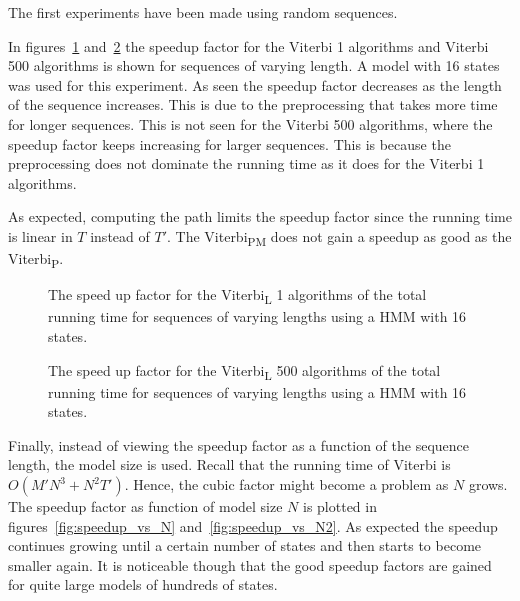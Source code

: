 The first experiments have been made using random sequences.

In figures~\ref{fig:compressed_1_speedup_vs_sequence_length}
and~\ref{fig:compressed_500_speedup_vs_sequence_length} the speedup factor for
the Viterbi 1 algorithms and Viterbi 500 algorithms is shown for sequences of
varying length. A model with 16 states was used for this experiment. As seen
the speedup factor decreases as the length of the sequence increases. This is
due to the preprocessing that takes more time for longer
sequences.   This
is not seen for the Viterbi 500 algorithms, where the speedup factor keeps
increasing for larger sequences. This is because the preprocessing does not
dominate the running time as it does for the Viterbi 1 algorithms.

As expected, computing the path limits the speedup factor since the running
time is linear in $T$ instead of $T'$. The Viterbi\textsubscript{PM} does not
gain a speedup as good as the Viterbi\textsubscript{P}. 

\begin{figure}
  \centering
  
  \caption{The speed up factor for the Viterbi\textsubscript{L} 1 algorithms of the total
    running time for sequences of varying lengths using
    a HMM with 16 states.}
  \label{fig:compressed_1_speedup_vs_sequence_length}
\end{figure}

\begin{figure}
  \centering
  
  \caption{The speed up factor for the Viterbi\textsubscript{L} 500 algorithms of the total
    running time for sequences of varying lengths using
    a HMM with 16 states.}
  \label{fig:compressed_500_speedup_vs_sequence_length}
\end{figure}

Finally, instead of viewing the speedup factor as a function of the sequence
length, the model size is used. Recall that the running time of Viterbi is
$O(M' N^3 + N^2 T')$. Hence, the cubic factor might become a problem as $N$
grows. The speedup factor as function of model size $N$ is plotted in
figures~\ref{fig:speedup_vs_N} and~\ref{fig:speedup_vs_N2}. As expected the
speedup continues growing until a certain number of states and then starts to
become smaller again. It is noticeable though that the good speedup factors are
gained for quite large models of hundreds of states.

